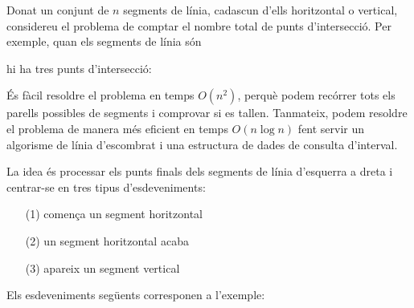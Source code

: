 Donat un conjunt de $n$ segments de línia, cadascun d'ells horitzontal
o vertical, considereu el problema de comptar el nombre total de punts
d'intersecció. Per exemple, quan els segments de línia són
\begin{center}
\end{center}
hi ha tres punts d'intersecció:
\begin{center}
\end{center}

És fàcil resoldre el problema en temps $O(n^2)$, perquè podem recórrer
tots els parells possibles de segments i comprovar si es
tallen. Tanmateix, podem resoldre el problema de manera més eficient
en temps $O(n \log n)$ fent servir un algorisme de línia d'escombrat i
una estructura de dades de consulta d'interval.

La idea és processar els punts finals dels segments de línia
d'esquerra a dreta i centrar-se en tres tipus d'esdeveniments:
\begin{enumerate}[noitemsep]
\item[(1)] comença un segment horitzontal
\item[(2)] un segment horitzontal acaba
\item[(3)] apareix un segment vertical
\end{enumerate}

Els esdeveniments següents corresponen a l'exemple:
\begin{center}
\end{center}

